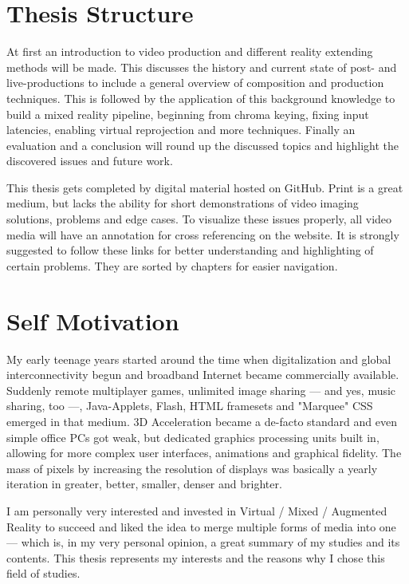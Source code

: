 \section{Thesis Structure}
\label{sec:intro:structure}

At first an introduction to video production and different reality extending 
methods will be made. This discusses the history and current state of post- and 
live-productions to include a general overview of composition and production 
techniques.
\newline
This is followed by the application of this background knowledge to build a 
mixed reality pipeline, beginning from chroma keying, fixing input latencies, 
enabling virtual reprojection and more techniques.
\newline
Finally an evaluation and a conclusion will round up the discussed topics and 
highlight the discovered issues and future work.

This thesis gets completed by digital material hosted on GitHub. Print is a 
great medium, but lacks the ability for short demonstrations of video imaging 
solutions, problems and edge cases. To visualize these issues properly, all 
video media will have an annotation for cross referencing on the website. It is 
strongly suggested to follow these links for better understanding and 
highlighting of certain problems. They are sorted by chapters for easier 
navigation.

\section{Self Motivation}
\label{sec:intro:self-motivation}

My early teenage years started around the time when digitalization and global
interconnectivity begun and broadband Internet became commercially available.
Suddenly remote multiplayer games, unlimited image sharing --- and yes, music
sharing, too ---, Java-Applets, Flash, HTML framesets and "Marquee" CSS emerged 
in that medium. 3D Acceleration became a de-facto standard and even simple 
office PCs got weak, but dedicated graphics processing units built in, allowing 
for more complex user interfaces, animations and graphical fidelity. The mass 
of pixels by increasing the resolution of displays was basically a yearly 
iteration in greater, better, smaller, denser and brighter.

I am personally very interested and invested in Virtual / Mixed / Augmented 
Reality to succeed and liked the idea to merge multiple forms of media into one 
--- which is, in my very personal opinion, a great summary of my studies and 
its contents. This thesis represents my interests and the reasons why I chose 
this field of studies.